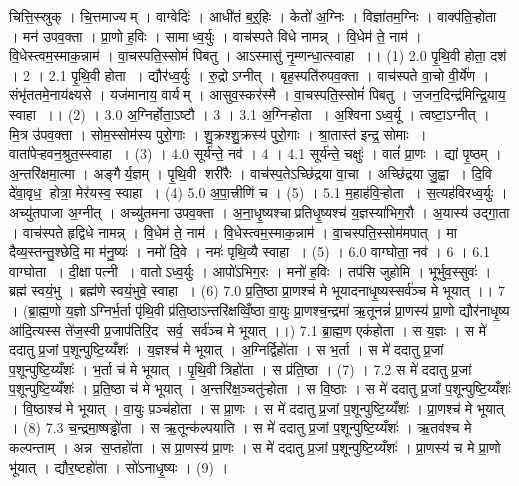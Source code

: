 
\setcounter{anuvakam}{0}
चित्ति॒स्स्रुक् । चि॒त्तमाज्यम् । वाग्वेदिः॑ । आधी॑तं ब॒ऱ्॒हिः । केतो॑ अ॒ग्निः । विज्ञा॑तम॒ग्निः । वाक्प॑ति॒ऱ्होता । मन॑ उपव॒क्ता । प्रा॒णो ह॒विः । सामाध्व॒र्युः । वाच॑स्पते विधे नामन्न् । वि॒धेम॑ ते॒ नाम॑ । वि॒धेस्त्वम॒स्माक॒न्नाम॑ । वा॒चस्पति॒स्सोमं॑ पिबतु । आऽस्मासु॑ नृ॒म्णन्धा॒त्स्वाहा ।। (1)
2.0
पृ॒थि॒वी होता॒ दश॑ । 2 ।
2.1
पृ॒थि॒वी होता । द्यौर॑ध्व॒र्युः । रु॒द्रोऽग्नीत् । बृह॒स्पति॑रुपव॒क्ता । वाच॑स्पते वा॒चो वी॒र्ये॑ण । संभृ॑ततमे॒नाय॑क्ष्यसे । यज॑मानाय॒ वार्यम् । आसुव॒स्कर॑स्मै । वा॒चस्पति॒स्सोमं॑ पिबतु । ज॒जन॒दिन्द्र॑मिन्द्रि॒याय॒ स्वाहा ।। (2) ।
3.0
अ॒ग्निर्होता॒ऽष्टौ । 3 ।
3.1
अ॒ग्निऱ्होता । अ॒श्विनाऽध्व॒र्यू । त्वष्टा॒ऽग्नीत् । मि॒त्र उ॑पव॒क्ता । सोम॒स्सोम॑स्य पुरो॒गाः । शु॒क्रश्शु॒क्रस्य॑ पुरो॒गाः । श्रा॒तास्त॑ इन्द्र॒ सोमाः । वाता॑पेऱ्हवन॒श्रुत॒स्स्वाहा । (3) ।
4.0
सूर्य॑न्ते॒ नव॑ । 4 ।
4.1
सूर्य॑न्ते॒ चक्षुः॑ । वातं॑ प्रा॒णः । द्यां पृ॒ष्ठम् । अ॒न्तरि॑क्षमा॒त्मा । अङ्गैर्य॒ज्ञम् । पृ॒थि॒वी शरी॑रैः । वाच॑स्प॒तेऽच्छि॑द्रया वा॒चा । अच्छि॑द्रया जु॒ह्वा । दि॒वि दे॑वा॒वृध॒॒ होत्रा॒ मेर॑यस्व॒ स्वाहा । (4)
5.0
अ॒पा॒त्त्रीणि॑ च । (5) ।
5.1
म॒हाह॑वि॒ऱ्होता । स॒त्यह॑विरध्व॒र्युः । अच्यु॑तपाजा अ॒ग्नीत् । अच्यु॑तमना उपव॒क्ता । अ॒ना॒धृ॒ष्यश्चाप्रतिधृ॒ष्यश्च॑ य॒ज्ञस्या॑भिग॒रौ । अ॒यास्य॑ उद्गा॒ता । वाच॑स्पते हृद्विधे नामन्न् । वि॒धेम॑ ते॒ नाम॑ । वि॒धेस्त्वम॒स्माक॒न्नाम॑ । वा॒चस्पति॒स्सोम॑मपात् । मा दैव्य॒स्तन्तु॒श्छेदि॒ मा म॑नु॒ष्यः॑ । नमो॑ दि॒वे । नमः॑ पृथि॒व्यै स्वाहा । (5) ।
6.0
वाग्घोता॒ नव॑ । 6 ।
6.1
वाग्घोता । दी॒क्षा पत्नी । वातोऽध्व॒र्युः । आपो॑ऽभिग॒रः । मनो॑ ह॒विः । तप॑सि जुहोमि । भूर्भुव॒स्सुवः॑ । ब्रह्म॑ स्वयं॒भु । ब्रह्म॑णे स्वयं॒भुवे॒ स्वाहा । (6)
7.0
प्र॒ति॒ष्ठा प्रा॒णश्च॑ मे भूयादनाधृ॒ष्यस्सर्व॑ञ्च मे भूयात् ।। 7 । (ब्रा॒ह्म॒णो य॒ज्ञोऽग्निर्भ॒र्ता पृ॑थि॒वी प्र॑ति॒ष्ठाऽन्तरि॑क्षव्विँ॒ष्ठा वा॒युः प्रा॒णश्च॒न्द्रमा॑ ऋ॒तूनन्नं॑ प्रा॒णस्य॑ प्रा॒णो द्यौर॑नाधृ॒ष्य आ॑दि॒त्यस्स ते॑ज॒स्वी प्र॒जाप॑तिरि॒द सर्व॒॒ सर्व॑ञ्च मे भूयात् ।।)
7.1
ब्रा॒ह्म॒ण एक॑होता । स य॒ज्ञः । स मे॑ ददातु प्र॒जां प॒शून्पुष्टि॒य्यँशः॑ । य॒ज्ञश्च॑ मे भूयात् । अ॒ग्निर्द्विहो॑ता । स भ॒र्ता । स मे॑ ददातु प्र॒जां प॒शून्पुष्टि॒य्यँशः॑ । भ॒र्ता च॑ मे भूयात् । पृ॒थि॒वी त्रिहो॑ता । स प्र॑ति॒ष्ठा । (7) ।
7.2
स मे॑ ददातु प्र॒जां प॒शून्पुष्टि॒य्यँशः॑ । प्र॒ति॒ष्ठा च॑ मे भूयात् । अ॒न्तरि॑क्ष॒ञ्चतु॑ऱ्होता । स वि॒ष्ठाः । स मे॑ ददातु प्र॒जां प॒शून्पुष्टि॒य्यँशः॑ । वि॒ष्ठाश्च॑ मे भूयात् । वा॒युः प़ञ्च॑होता । स प्रा॒णः । स मे॑ ददातु प्र॒जां प॒शून्पुष्टि॒य्यँशः॑ । प्रा॒णश्च॑ मे भूयात् । (8)
7.3
च॒न्द्रमा॒ष्षड्ढो॑ता । स ऋ॒तून्क॑ल्पयाति । स मे॑ ददातु प्र॒जां प॒शून्पुष्टि॒य्यँशः॑ । ऋ॒तव॑श्च मे कल्पन्ताम् । अन्न॑ स॒प्तहो॑ता । स प्रा॒णस्य॑ प्रा॒णः । स मे॑ ददातु प्र॒जां प॒शून्पुष्टि॒य्यँशः॑ । प्रा॒णस्य॑ च मे प्रा॒णो भू॑यात् । द्यौर॒ष्टहो॑ता । सो॑ऽनाधृ॒ष्यः । (9) ।

